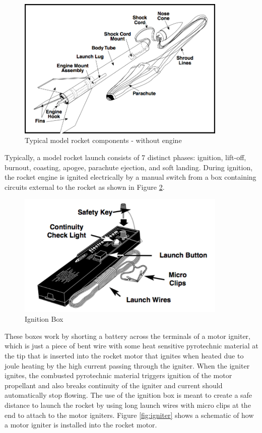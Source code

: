 \documentclass{workreport}
\begin{document}
\begin{body}
	\begin{figure}[!ht]
		\centering
		\includegraphics[width=10cm]{./images/model_rocket_components.png}
		\caption{Typical model rocket components - without engine \cite{estes_rocket_tech}}
		\label{fig:rocket_comp}
	\end{figure}


	Typically, a model rocket launch consists of 7 distinct phases: ignition, lift-off, burnout, coasting, apogee, parachute ejection, and soft landing. During ignition, the rocket engine is ignited electrically by a manual switch from a box containing circuits external to the rocket as shown in Figure \ref{fig:ignition_box}.

	\begin{figure}[!ht]
		\centering
		\includegraphics[width=10cm]{./images/ignition_box.png}
		\caption{Ignition Box \cite{estes_rocket_tech}}
		\label{fig:ignition_box}
	\end{figure}

	These boxes work by shorting a battery across the terminals of a motor igniter, which is just a piece of bent wire with some heat sensitive pyrotechnic material at the tip that is inserted into the rocket motor that ignites when heated due to joule heating by the high current passing through the igniter. When the igniter ignites, the combusted pyrotechnic material triggers ignition of the motor propellant and also breaks continuity of the igniter and current should automatically stop flowing. The use of the ignition box is meant to create a safe distance to launch the rocket by using long launch wires with micro clips at the end to attach to the motor igniters. Figure \ref{fig:igniter} shows a schematic of how a motor igniter is installed into the rocket motor.


\end{body}
\end{document}
